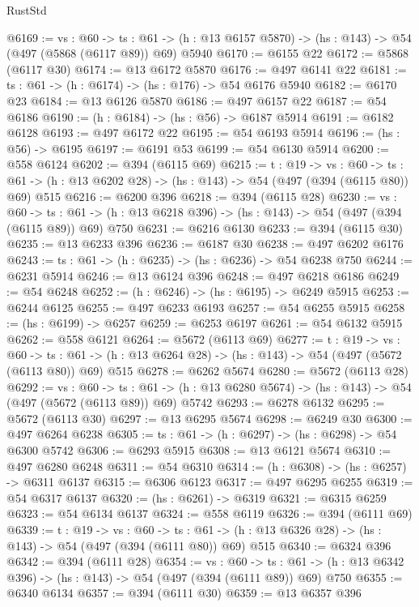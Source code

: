 \begin{lexlean}{RustStd}
\begin{coremodule}
@6169 := {vs : @60} ->
  {ts : @61} -> (h : @13 @6157 @5870) -> (hs : @143) -> @54 (@497 (@5868 (@6117 @89)) @69) @5940
@6170 := @6155 @22
@6172 := @5868 (@6117 @30)
@6174 := @13 @6172 @5870
@6176 := @497 @6141 @22
@6181 := {ts : @61} -> (h : @6174) -> (hs : @176) -> @54 @6176 @5940
@6182 := @6170 @23
@6184 := @13 @6126 @5870
@6186 := @497 @6157 @22
@6187 := @54 @6186
@6190 := (h : @6184) -> (hs : @56) -> @6187 @5914
@6191 := @6182 @6128
@6193 := @497 @6172 @22
@6195 := @54 @6193 @5914
@6196 := (hs : @56) -> @6195
@6197 := @6191 @53
@6199 := @54 @6130 @5914
@6200 := @558 @6124
@6202 := @394 (@6115 @69)
@6215 := {t : @19} ->
  {vs : @60} ->
  {ts : @61} -> (h : @13 @6202 @28) -> (hs : @143) -> @54 (@497 (@394 (@6115 @80)) @69) @515
@6216 := @6200 @396
@6218 := @394 (@6115 @28)
@6230 := {vs : @60} ->
  {ts : @61} -> (h : @13 @6218 @396) -> (hs : @143) -> @54 (@497 (@394 (@6115 @89)) @69) @750
@6231 := @6216 @6130
@6233 := @394 (@6115 @30)
@6235 := @13 @6233 @396
@6236 := @6187 @30
@6238 := @497 @6202 @6176
@6243 := {ts : @61} -> (h : @6235) -> (hs : @6236) -> @54 @6238 @750
@6244 := @6231 @5914
@6246 := @13 @6124 @396
@6248 := @497 @6218 @6186
@6249 := @54 @6248
@6252 := (h : @6246) -> (hs : @6195) -> @6249 @5915
@6253 := @6244 @6125
@6255 := @497 @6233 @6193
@6257 := @54 @6255 @5915
@6258 := (hs : @6199) -> @6257
@6259 := @6253 @6197
@6261 := @54 @6132 @5915
@6262 := @558 @6121
@6264 := @5672 (@6113 @69)
@6277 := {t : @19} ->
  {vs : @60} ->
  {ts : @61} -> (h : @13 @6264 @28) -> (hs : @143) -> @54 (@497 (@5672 (@6113 @80)) @69) @515
@6278 := @6262 @5674
@6280 := @5672 (@6113 @28)
@6292 := {vs : @60} ->
  {ts : @61} -> (h : @13 @6280 @5674) -> (hs : @143) -> @54 (@497 (@5672 (@6113 @89)) @69) @5742
@6293 := @6278 @6132
@6295 := @5672 (@6113 @30)
@6297 := @13 @6295 @5674
@6298 := @6249 @30
@6300 := @497 @6264 @6238
@6305 := {ts : @61} -> (h : @6297) -> (hs : @6298) -> @54 @6300 @5742
@6306 := @6293 @5915
@6308 := @13 @6121 @5674
@6310 := @497 @6280 @6248
@6311 := @54 @6310
@6314 := (h : @6308) -> (hs : @6257) -> @6311 @6137
@6315 := @6306 @6123
@6317 := @497 @6295 @6255
@6319 := @54 @6317 @6137
@6320 := (hs : @6261) -> @6319
@6321 := @6315 @6259
@6323 := @54 @6134 @6137
@6324 := @558 @6119
@6326 := @394 (@6111 @69)
@6339 := {t : @19} ->
  {vs : @60} ->
  {ts : @61} -> (h : @13 @6326 @28) -> (hs : @143) -> @54 (@497 (@394 (@6111 @80)) @69) @515
@6340 := @6324 @396
@6342 := @394 (@6111 @28)
@6354 := {vs : @60} ->
  {ts : @61} -> (h : @13 @6342 @396) -> (hs : @143) -> @54 (@497 (@394 (@6111 @89)) @69) @750
@6355 := @6340 @6134
@6357 := @394 (@6111 @30)
@6359 := @13 @6357 @396

\end{coremodule}
\end{lexlean}
